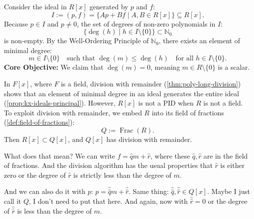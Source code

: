 \begin{proofWrapper}
\begin{content}
Consider the ideal in $R[x]$ generated by $p$ and $f$:
\begin{equation}\label{eq:ideal-I-def}
I := (p, f) = \{ A p + B f \mid A, B \in R[x] \} \subseteq R[x].
\end{equation}
Because $p \in I$ and $p \neq 0$, the set of degrees of non-zero polynomials in $I$:
\[
\{ \deg(h) \mid h \in I \setminus \{0\} \} \subset \mathbb{N}_0
\]
is non-empty. By the Well-Ordering Principle of $\mathbb{N}_0$, there exists an element of minimal degree:
\begin{equation}\label{eq:m-minimal-def}
m \in I \setminus \{0\} \quad \text{such that } \deg(m) \le \deg(h) \quad \text{for all } h \in I \setminus \{0\}.
\end{equation}
\textbf{Core Objective:} We claim that $\deg(m) = 0$, meaning $m \in R \setminus \{0\}$ is a scalar.

\begin{steps}
In $F[x]$, where $F$ is a field, division with remainder (\cref{thm:poly-long-division}) shows that an element of minimal degree in an ideal generates the entire ideal (\cref{prop:kx-ideals-principal}). However, $R[x]$ is not a PID when $R$ is not a field.
To exploit division with remainder, we embed $R$ into its field of fractions (\cref{def:field-of-fractions}):
\[
Q := \operatorname{Frac}(R).
\]
Then $R[x] \subset Q[x]$, and $Q[x]$ has division with remainder.
\end{steps}
\end{content}

\begin{speech}[00:39:16 - 00:41:26]
What does that mean? We can write $f = \hat{q} m + \hat{r}$,  where these $\hat{q}, \hat{r}$ are in the field of fractions.  And the division algorithm has the usual properties that $\hat{r}$ is either zero or the degree of $\hat{r}$ is strictly less than the degree of $m$. 

And we can also do it with $p$: $p = \hat{\hat{q}} m + \hat{\hat{r}}$.  Same thing: $\hat{\hat{q}}, \hat{\hat{r}} \in Q[x]$.  Maybe I just call it $Q$, I don't need to put that here. And again, now with $\hat{\hat{r}} = 0$ or the degree of $\hat{\hat{r}}$ is less than the degree of $m$. 


\end{speech}
\end{proofWrapper}
